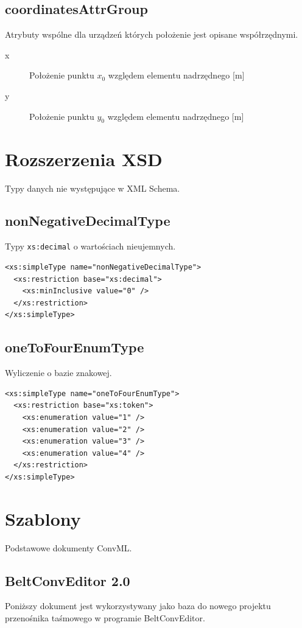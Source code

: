\documentclass[12pt,a4paper]{article}
\begin{document}
\subsection{coordinatesAttrGroup}
Atrybuty wspólne dla urządzeń których położenie jest opisane współrzędnymi.

\begin{description}
\item[x] Położenie punktu $x_0$ względem elementu nadrzędnego [m]
\item[y] Położenie punktu $y_0$ względem elementu nadrzędnego [m]
\end{description}

\section{Rozszerzenia XSD}
Typy danych nie występujące w XML Schema.

\subsection{nonNegativeDecimalType}
Typy {\tt xs:decimal} o wartościach nieujemnych.

\begin{verbatim}
<xs:simpleType name="nonNegativeDecimalType">
  <xs:restriction base="xs:decimal">
    <xs:minInclusive value="0" />
  </xs:restriction>
</xs:simpleType>
\end{verbatim}

\subsection{oneToFourEnumType}
Wyliczenie o bazie znakowej.

\begin{verbatim}
<xs:simpleType name="oneToFourEnumType">
  <xs:restriction base="xs:token">
    <xs:enumeration value="1" />
    <xs:enumeration value="2" />
    <xs:enumeration value="3" />
    <xs:enumeration value="4" />
  </xs:restriction>
</xs:simpleType>
\end{verbatim}


\section{Szablony}
Podstawowe dokumenty ConvML.

\subsection{BeltConvEditor 2.0}
Poniższy dokument jest wykorzystywany jako baza do nowego projektu
przenośnika taśmowego w programie BeltConvEditor.
\end{document}
